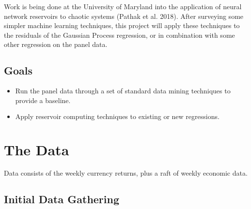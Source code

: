 \documentclass[]{article}
\newenvironment{Shaded}{\begin{snugshade}}{\end{snugshade}}
\newcommand{\KeywordTok}[1]{\textcolor[rgb]{0.13,0.29,0.53}{\textbf{#1}}}
\newcommand{\DataTypeTok}[1]{\textcolor[rgb]{0.13,0.29,0.53}{#1}}
\newcommand{\StringTok}[1]{\textcolor[rgb]{0.31,0.60,0.02}{#1}}
\newcommand{\OtherTok}[1]{\textcolor[rgb]{0.56,0.35,0.01}{#1}}
\newcommand{\ControlFlowTok}[1]{\textcolor[rgb]{0.13,0.29,0.53}{\textbf{#1}}}
\newcommand{\OperatorTok}[1]{\textcolor[rgb]{0.81,0.36,0.00}{\textbf{#1}}}
\newcommand{\NormalTok}[1]{#1}
\providecommand{\tightlist}{%
  \setlength{\itemsep}{0pt}\setlength{\parskip}{0pt}}
\begin{document}
Work is being done at the University of Maryland into the application of
neural network reservoirs to chaotic systems (Pathak et al. 2018). After
surveying some simpler machine learning techniques, this project will
apply these techniques to the residuals of the Gaussian Process
regression, or in combination with some other regression on the panel
data.

\subsection{Goals}\label{goals}

\begin{itemize}
\tightlist
\item
  Run the panel data through a set of standard data mining techniques to
  provide a baseline.
\item
  Apply reservoir computing techniques to existing or new regressions.
\end{itemize}

\section{The Data}\label{the-data}

\begin{Shaded}
\end{Shaded}

Data consists of the weekly currency returns, plus a raft of weekly
economic data.

\subsection{Initial Data Gathering}\label{initial-data-gathering}
\end{document}
